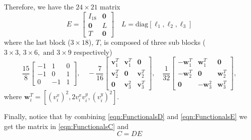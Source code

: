 Therefore, we have the $24\times 21$ matrix
\begin{equation*}
  E = \begin{bmatrix} I_{18} & \mathbf{0} \\
    \mathbf{0} & L \\
    T & \mathbf{0}
  \end{bmatrix} \quad L = \text{diag}[\ell_1,\ell_2,\ell_3]
\end{equation*}
where the last block ($3\times 18$), $T$, is composed of three sub blocks ($3\times 3,\, 3\times
6,\text{ and } 3\times 9$ respectively)
\begin{equation*}
  \frac{15}{8} \begin{bmatrix} -1 & 1 & 0\\ -1 & 0 & 1\\ 0 & -1 & 1\end{bmatrix}, \quad
  -\frac{7}{16} \begin{bmatrix} \mathbf{v}_1^T & \mathbf{v}_1^T & \mathbf{0}\\
    \mathbf{v}_2^T & \mathbf{0} & \mathbf{v}_2^T\\ \mathbf{0} & \mathbf{v}_3^2 & \mathbf{v}_3^T\end{bmatrix}, \quad
  \frac{1}{32} \begin{bmatrix} -\mathbf{w}_1^T & \mathbf{w}_1^T & \mathbf{0}\\
    -\mathbf{w}_2^T & \mathbf{0} & \mathbf{w}_2^T\\ \mathbf{0} & -\mathbf{w}_3^2 & \mathbf{w}_3^T\end{bmatrix},
\end{equation*}
where $\mathbf{w}_i^T = \left[ (v^x_i)^2, 2v^x_i v^y_i, (v^y_i)^2\right]$.

Finally, notice that by combining \eqref{eqn:FunctionalsD} and \eqref{eqn:FunctionalsE}
we get the matrix in \eqref{eqn:FunctionalsC} and
\begin{equation}
  C=DE
  \label{eqn:Transformation}
\end{equation}

